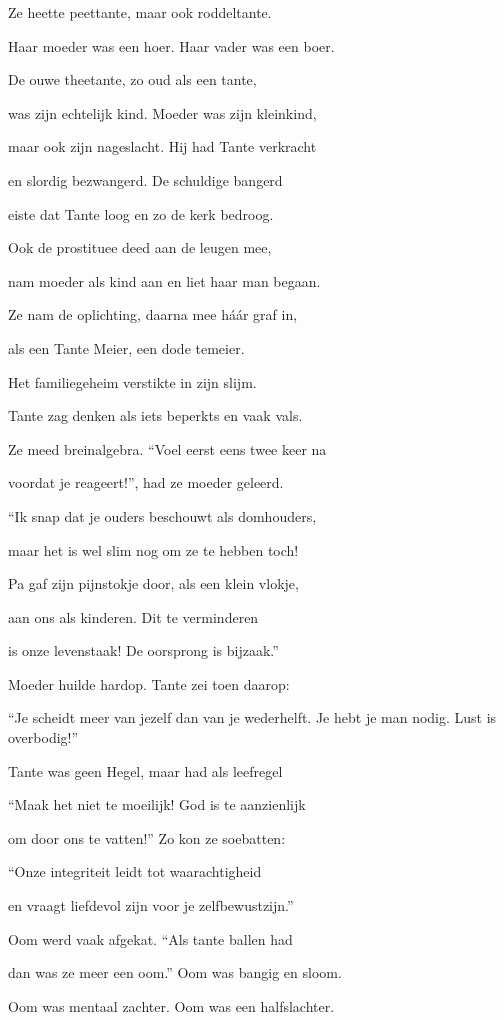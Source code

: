 Ze heette peettante,
maar ook roddeltante.

Haar moeder was een hoer.
Haar vader was een boer.

De ouwe theetante,
zo oud als een tante,

was zijn echtelijk kind.
Moeder was zijn kleinkind,

maar ook zijn nageslacht.
Hij had Tante verkracht

en slordig bezwangerd.
De schuldige bangerd

eiste dat Tante loog
en zo de kerk bedroog.

Ook de prostituee
deed aan de leugen mee,

nam moeder als kind aan
en liet haar man begaan.

Ze nam de oplichting,
daarna mee háár graf in,

als een Tante Meier,
een dode temeier.

Het familiegeheim
verstikte in zijn slijm.

Tante zag denken als
iets beperkts en vaak vals.

Ze meed breinalgebra.
“Voel eerst eens twee keer na

voordat je reageert!”,
had ze moeder geleerd.

“Ik snap dat je ouders
beschouwt als domhouders,

maar het is wel slim nog
om ze te hebben toch!

Pa gaf zijn pijnstokje
door, als een klein vlokje,

aan ons als kinderen.
Dit te verminderen

is onze levenstaak!
De oorsprong is bijzaak.”

Moeder huilde hardop.
Tante zei toen daarop:

“Je scheidt meer van jezelf
dan van je wederhelft.
Je hebt je man nodig.
Lust is overbodig!”

Tante was geen Hegel,
maar had als leefregel

“Maak het niet te moeilijk!
God is te aanzienlijk

om door ons te vatten!”
Zo kon ze soebatten:

“Onze integriteit
leidt tot waarachtigheid

en vraagt liefdevol zijn
voor je zelfbewustzijn.”

Oom werd vaak afgekat.
“Als tante ballen had

dan was ze meer een oom.”
Oom was bangig en sloom.

Oom was mentaal zachter.
Oom was een halfslachter.

